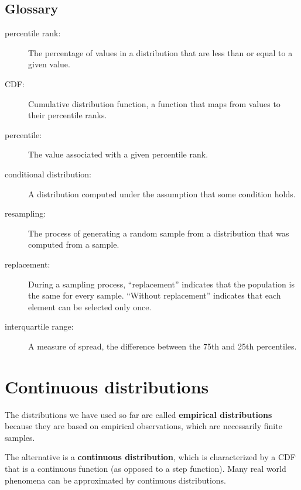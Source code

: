 \documentclass[12pt]{book}
\begin{document}
\section{Glossary}

\begin{description}

\item[percentile rank:] The percentage of values in a distribution that are
less than or equal to a given value.

\item[CDF:] Cumulative distribution function, a function that maps
  from values to their percentile ranks.

\item[percentile:] The value associated with a given percentile rank.

\item[conditional distribution:] A distribution computed under the assumption
that some condition holds.

\item[resampling:] The process of generating a random sample from a
distribution that was computed from a sample.

\item[replacement:] During a sampling process, ``replacement'' indicates
that the population is the same for every sample.  ``Without replacement''
indicates that each element can be selected only once.

\item[interquartile range:] A measure of spread, the difference between
the 75th and 25th percentiles.

\end{description}



\chapter{Continuous distributions}
\label{continuous}

The distributions we have used so far are called {\bf
  empirical distributions} because they are based on empirical
observations, which are necessarily finite samples.

The alternative is a {\bf continuous distribution}, which is
characterized by a CDF that is a continuous function (as opposed to a
step function).  Many real world phenomena can be approximated by
continuous distributions.
\end{document}
